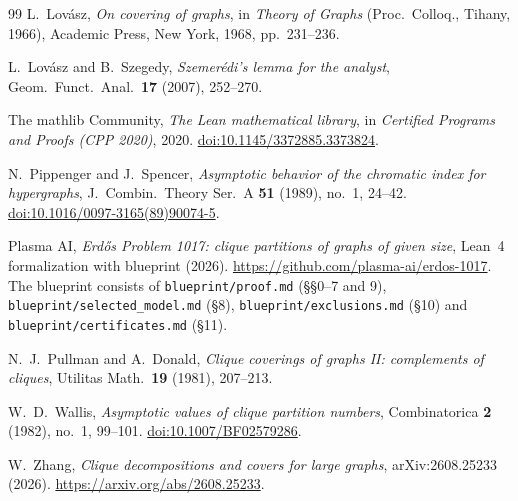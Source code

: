 \documentclass[10pt]{article}
\theoremstyle{definition}
\theoremstyle{remark}
\numberwithin{equation}{section}
\newcommand{\lean}[1]{\texttt{#1}}
\begin{document}
\begin{thebibliography}{99}
L.~Lov\'asz, \emph{On covering of graphs}, in \emph{Theory of Graphs} (Proc.\ Colloq., Tihany, 1966), Academic Press, New York, 1968, pp.~231--236.

L.~Lov\'asz and B.~Szegedy, \emph{Szemer\'edi's lemma for the analyst}, Geom.\ Funct.\ Anal.\ \textbf{17} (2007), 252--270.

The mathlib Community, \emph{The Lean mathematical library}, in \emph{Certified Programs and Proofs (CPP 2020)}, 2020. \href{https://doi.org/10.1145/3372885.3373824}{doi:10.1145/3372885.3373824}.

N.~Pippenger and J.~Spencer, \emph{Asymptotic behavior of the chromatic index for hypergraphs}, J.\ Combin.\ Theory Ser.\ A \textbf{51} (1989), no.~1, 24--42. \href{https://doi.org/10.1016/0097-3165(89)90074-5}{doi:10.1016/0097-3165(89)90074-5}.

Plasma AI, \emph{Erd\H{o}s Problem 1017: clique partitions of graphs of given size}, Lean~4 formalization with blueprint (2026). \url{https://github.com/plasma-ai/erdos-1017}. The blueprint consists of \lean{blueprint/proof.md} (\S\S0--7 and 9), \lean{blueprint/selected\_model.md} (\S8), \lean{blueprint/exclusions.md} (\S10) and \lean{blueprint/certificates.md} (\S11).

N.~J.~Pullman and A.~Donald, \emph{Clique coverings of graphs II: complements of cliques}, Utilitas Math.\ \textbf{19} (1981), 207--213.

W.~D.~Wallis, \emph{Asymptotic values of clique partition numbers}, Combinatorica \textbf{2} (1982), no.~1, 99--101. \href{https://doi.org/10.1007/BF02579286}{doi:10.1007/BF02579286}.

W.~Zhang, \emph{Clique decompositions and covers for large graphs}, arXiv:2608.25233 (2026). \url{https://arxiv.org/abs/2608.25233}.

\end{thebibliography}
\end{document}
